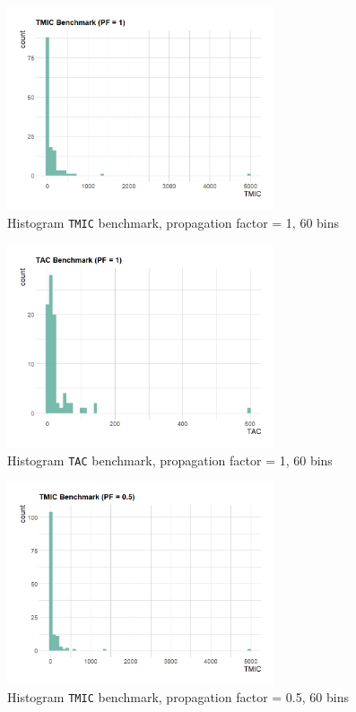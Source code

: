 \begin{figure}[ht!]
\begin{center}
  \includegraphics[width=0.7\textwidth]{figures/benchmark/TMIC_PF_1.png}
  \caption{Histogram \texttt{TMIC} benchmark, propagation factor = 1, 60 bins}
  \label{fig:TMIC-benchmark-1}
\end{center}
\end{figure}

\begin{figure}[ht!]
\begin{center}
\includegraphics[width=0.7\textwidth]{figures/benchmark/TAC_PF_1.png}
\caption{Histogram \texttt{TAC} benchmark, propagation factor = 1, 60 bins}
\label{fig:TAC-benchmark-1}
\end{center}
\end{figure}

\begin{figure}[ht!]
\begin{center}
  \includegraphics[width=0.7\textwidth]{figures/benchmark/TMIC_PF_0.5.png}
  \caption{Histogram \texttt{TMIC} benchmark, propagation factor = 0.5, 60 bins}
  \label{fig:TMIC-benchmark-0.5}
\end{center}
\end{figure}

